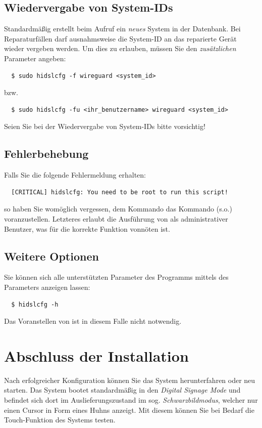 \documentclass[a4paper,11pt,authoryear]{article}
\begin{document}
\subsection{Wiedervergabe von System-IDs}
Standardmäßig erstellt  beim Aufruf ein \emph{neues} System in der Datenbank.
Bei Reparaturfällen darf ausnahmsweise die System-ID an das reparierte Gerät wieder vergeben werden.
Um dies zu erlauben, müssen Sie den \emph{zusätzlichen} Parameter  angeben:
\begin{verbatim}
  $ sudo hidslcfg -f wireguard <system_id>
\end{verbatim}
bzw.
\begin{verbatim}
  $ sudo hidslcfg -fu <ihr_benutzername> wireguard <system_id>
\end{verbatim}
Seien Sie bei der Wiedervergabe von System-IDs bitte vorsichtig!

\subsection{Fehlerbehebung}
Falls Sie die folgende Fehlermeldung erhalten:
\begin{verbatim}
  [CRITICAL] hidslcfg: You need to be root to run this script!
\end{verbatim}
so haben Sie womöglich vergessen, dem Kommando  das Kommando  (s.o.) voranzustellen.
Letzteres erlaubt die Ausführung von  als administrativer Benutzer, was für die korrekte Funktion vonnöten ist.
\subsection{Weitere Optionen}
Sie können sich alle unterstützten Parameter des Programms  mittels des Parameters  anzeigen lassen:
\begin{verbatim}
  $ hidslcfg -h
\end{verbatim}
Das Voranstellen von  ist in diesem Falle nicht notwendig.

\section{Abschluss der Installation}
Nach erfolgreicher Konfiguration können Sie das System herunterfahren oder neu starten.
Das System bootet standardmäßig in den \emph{Digital Signage Mode} und befindet sich dort im Auslieferungszustand im sog. \emph{Schwarzbildmodus}, welcher nur einen Cursor in Form eines Huhns anzeigt.
Mit diesem können Sie bei Bedarf die Touch-Funktion des Systems testen.
\end{document}
